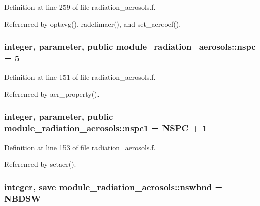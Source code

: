 Definition at line 259 of file radiation\+\_\+aerosols.\+f.



Referenced by optavg(), radclimaer(), and set\+\_\+aercoef().

\subsubsection[{\texorpdfstring{nspc}{nspc}}]{\setlength{\rightskip}{0pt plus 5cm}integer, parameter, public module\+\_\+radiation\+\_\+aerosols\+::nspc = 5}\hypertarget{namespacemodule__radiation__aerosols_a3d126c465af80bb698d9d1a288c181bb}{}\label{namespacemodule__radiation__aerosols_a3d126c465af80bb698d9d1a288c181bb}


Definition at line 151 of file radiation\+\_\+aerosols.\+f.



Referenced by aer\+\_\+property().

\subsubsection[{\texorpdfstring{nspc1}{nspc1}}]{\setlength{\rightskip}{0pt plus 5cm}integer, parameter, public module\+\_\+radiation\+\_\+aerosols\+::nspc1 = N\+S\+PC + 1}\hypertarget{namespacemodule__radiation__aerosols_a476c0181513603112dec3f4d2a2ec839}{}\label{namespacemodule__radiation__aerosols_a476c0181513603112dec3f4d2a2ec839}


Definition at line 153 of file radiation\+\_\+aerosols.\+f.



Referenced by setaer().

\subsubsection[{\texorpdfstring{nswbnd}{nswbnd}}]{\setlength{\rightskip}{0pt plus 5cm}integer, save module\+\_\+radiation\+\_\+aerosols\+::nswbnd = N\+B\+D\+SW\hspace{0.3cm}{\ttfamily [private]}}\hypertarget{namespacemodule__radiation__aerosols_a1d6c41e3bb818aa8b6f8f10d1c3f38a7}{}\label{namespacemodule__radiation__aerosols_a1d6c41e3bb818aa8b6f8f10d1c3f38a7}


